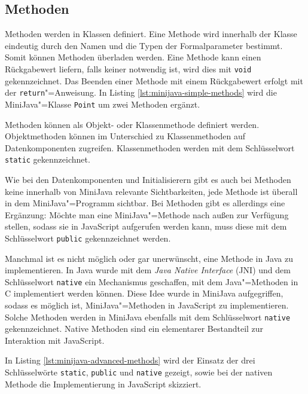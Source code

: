 \pagebreak
\subsection{Methoden}
\label{subsec:MiniJava-Methoden}

Methoden werden in Klassen definiert. Eine Methode wird innerhalb der Klasse eindeutig durch den Namen und die Typen der Formalparameter bestimmt. Somit können Methoden überladen werden. Eine Methode kann einen Rückgabewert liefern, falls keiner notwendig ist, wird dies mit \lstinline{void} gekennzeichnet. Das Beenden einer Methode mit einem Rückgabewert erfolgt mit der \lstinline{return}"=Anweisung. In Listing \ref{lst:minijava-simple-methods} wird die MiniJava"=Klasse \lstinline{Point} um zwei Methoden ergänzt.



Methoden können als Objekt- oder Klassenmethode definiert werden. Objektmethoden können im Unterschied zu Klassenmethoden auf Datenkomponenten zugreifen. Klassenmethoden werden mit dem Schlüsselwort \lstinline{static} gekennzeichnet.

Wie bei den Datenkomponenten und Initialisierern gibt es auch bei Methoden keine innerhalb von MiniJava relevante Sichtbarkeiten, jede Methode ist überall in dem MiniJava"=Programm sichtbar. Bei Methoden gibt es allerdings eine Ergänzung: Möchte man eine MiniJava"=Methode nach außen zur Verfügung stellen, sodass sie in JavaScript aufgerufen werden kann, muss diese mit dem Schlüsselwort \lstinline{public} gekennzeichnet werden.

Manchmal ist es nicht möglich oder gar unerwünscht, eine Methode in Java zu implementieren. In Java wurde mit dem \emph{Java Native Interface} (JNI) \cite{JNI8} und dem Schlüsselwort \lstinline{native} ein Mechanismus geschaffen, mit dem Java"=Methoden in C implementiert werden können. Diese Idee wurde in MiniJava aufgegriffen, sodass es möglich ist, MiniJava"=Methoden in JavaScript zu implementieren. Solche Methoden werden in MiniJava ebenfalls mit dem Schlüsselwort \lstinline{native} gekennzeichnet. Native Methoden sind ein elementarer Bestandteil zur Interaktion mit JavaScript.

In Listing \ref{lst:minijava-advanced-methods} wird der Einsatz der drei Schlüsselwörte \lstinline{static}, \lstinline{public} und \lstinline{native} gezeigt, sowie bei der nativen Methode die Implementierung in JavaScript skizziert.

